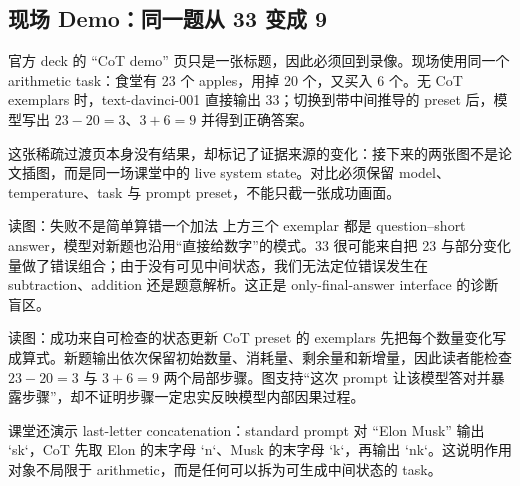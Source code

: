 
\subsection{现场 Demo：同一题从 33 变成 9}

官方 deck 的 ``CoT demo'' 页只是一张标题，因此必须回到录像。现场使用同一个 arithmetic task：食堂有 23 个 apples，用掉 20 个，又买入 6 个。无 CoT exemplars 时，text-davinci-001 直接输出 33；切换到带中间推导的 preset 后，模型写出 $23-20=3$、$3+6=9$ 并得到正确答案。


这张稀疏过渡页本身没有结果，却标记了证据来源的变化：接下来的两张图不是论文插图，而是同一场课堂中的 live system state。对比必须保留 model、temperature、task 与 prompt preset，不能只截一张成功画面。


\begin{knowledgebox}{读图：失败不是简单算错一个加法}
上方三个 exemplar 都是 question--short answer，模型对新题也沿用“直接给数字”的模式。33 很可能来自把 23 与部分变化量做了错误组合；由于没有可见中间状态，我们无法定位错误发生在 subtraction、addition 还是题意解析。这正是 only-final-answer interface 的诊断盲区。
\end{knowledgebox}


\begin{knowledgebox}{读图：成功来自可检查的状态更新}
CoT preset 的 exemplars 先把每个数量变化写成算式。新题输出依次保留初始数量、消耗量、剩余量和新增量，因此读者能检查 $23-20=3$ 与 $3+6=9$ 两个局部步骤。图支持“这次 prompt 让该模型答对并暴露步骤”，却不证明步骤一定忠实反映模型内部因果过程。
\end{knowledgebox}

课堂还演示 last-letter concatenation：standard prompt 对 ``Elon Musk'' 输出 `sk`，CoT 先取 Elon 的末字母 `n`、Musk 的末字母 `k`，再输出 `nk`。这说明作用对象不局限于 arithmetic，而是任何可以拆为可生成中间状态的 task。

